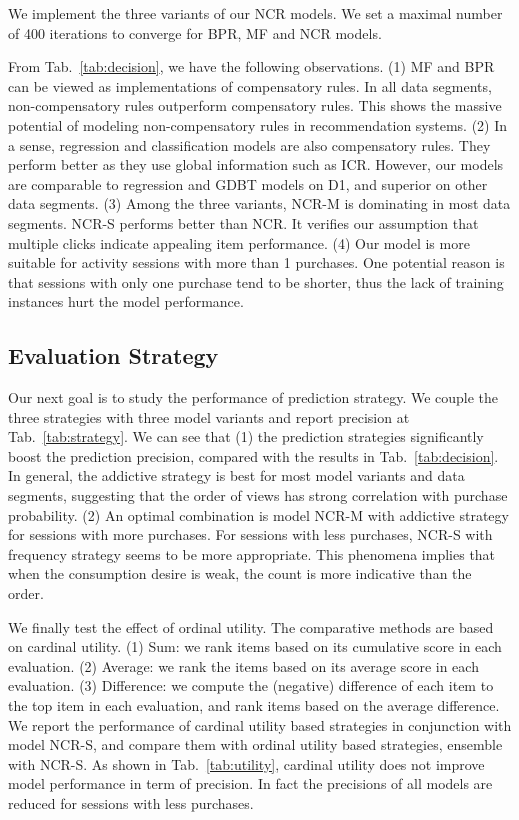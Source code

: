 \documentclass[sigconf]{acmart}
\begin{document}
We implement the three variants of our NCR models. We set a maximal number of 400 iterations to converge for BPR, MF and NCR models.

From Tab.~\ref{tab:decision}, we have the following observations. (1) MF and BPR can be viewed as implementations of compensatory rules. In all data segments, non-compensatory rules outperform compensatory rules. This shows the massive potential of modeling non-compensatory rules in recommendation systems. (2) In a sense, regression and classification models are also compensatory rules. They perform better as they use global information such as ICR. However, our models are comparable to regression and GDBT models on D1, and superior on other data segments. (3) Among the three variants, NCR-M is dominating in most data segments. NCR-S performs better than NCR. It verifies our assumption that multiple clicks indicate appealing item performance. (4) Our model is more suitable for activity sessions with more than 1 purchases. One potential reason is that sessions with only one purchase tend to be shorter, thus the lack of training instances hurt the model performance.  



\subsection{Evaluation Strategy}


Our next goal is to study the performance of prediction strategy. We couple the three strategies with three model variants and report precision at Tab.~\ref{tab:strategy}. We can see that (1) the prediction strategies significantly boost the prediction precision, compared with the results in Tab.~\ref{tab:decision}. In general, the addictive strategy is best for most model variants and data segments, suggesting that the order of views has strong correlation with purchase probability.  (2) An optimal combination is model NCR-M with addictive strategy for sessions with more purchases. For sessions with less purchases, NCR-S with frequency strategy seems to be more appropriate. This phenomena implies that when the consumption desire is weak, the count is more indicative than the order. 

We finally test the effect of ordinal utility. The comparative methods are based on  cardinal utility. (1) Sum: we rank items based on its cumulative score in each evaluation. (2) Average: we rank the items based on its average score in each evaluation. (3) Difference: we compute the (negative) difference of each item to the top item in each evaluation, and rank items based on the average difference. We report the performance of cardinal utility based strategies in conjunction with model NCR-S, and compare them with ordinal utility based strategies, ensemble with NCR-S. As shown in Tab.~\ref{tab:utility}, cardinal utility does not improve model performance in term of precision. In fact the precisions of all models are reduced for sessions with less purchases. 
\end{document}
